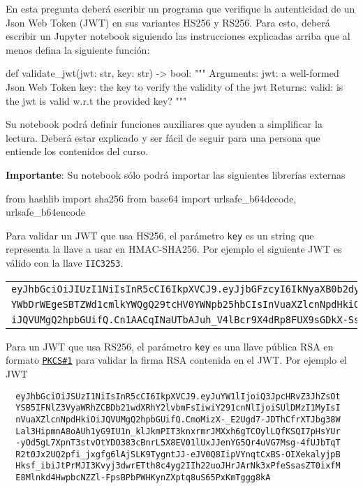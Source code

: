 
\pagebreak

En esta pregunta deberá escribir un programa que verifique la autenticidad de un Json Web Token (JWT) en sus variantes HS256 y RS256. Para esto, deberá escribir un Jupyter notebook siguiendo las instrucciones explicadas arriba que al menos defina la siguiente función:

\begin{python}
def validate_jwt(jwt: str, key: str) -> bool:
    """
    Arguments:
      jwt: a well-formed Json Web Token
      key: the key to verify the validity of the jwt
    Returns:
      valid: is the jwt is valid w.r.t the provided key?
    """
\end{python}
Su notebook podrá definir funciones auxiliares que ayuden a simplificar la lectura. Deberá estar explicado y ser fácil de seguir para una persona que entiende los contenidos del curso.

\textbf{Importante}: Su notebook sólo podrá importar las siguientes librerías externas
\begin{python}
from hashlib import sha256
from base64 import urlsafe_b64decode, urlsafe_b64encode
\end{python}


Para validar un JWT que usa HS256, el parámetro \texttt{key} es un string que representa la llave a usar en HMAC-SHA256. Por ejemplo el siguiente JWT es válido con la llave \texttt{IIC3253}.

\begin{tabular}{l}
  \texttt{eyJhbGciOiJIUzI1NiIsInR5cCI6IkpXVCJ9.eyJjbGFzcyI6IkNyaXB0b2dy}\\
  \texttt{YWbDrWEgeSBTZWd1cmlkYWQgQ29tcHV0YWNpb25hbCIsInVuaXZlcnNpdHkiO}\\
  \texttt{iJQVUMgQ2hpbGUifQ.Cn1AACqINaUTbAJuh\_V4lBcr9X4dRp8FUX9sGDkX-Ss}
\end{tabular}

Para un JWT que usa RS256, el parámetro \texttt{key} es una llave pública RSA en formato \href{https://www.rfc-editor.org/rfc/rfc8017}{\texttt{PKCS\#1}} para validar la firma RSA contenida en el JWT. Por ejemplo el JWT

\begin{verbatim}
  eyJhbGciOiJSUzI1NiIsInR5cCI6IkpXVCJ9.eyJuYW1lIjoiQ3JpcHRvZ3JhZsOt
  YSB5IFNlZ3VyaWRhZCBDb21wdXRhY2lvbmFsIiwiY291cnNlIjoiSUlDMzI1MyIsI
  nVuaXZlcnNpdHkiOiJQVUMgQ2hpbGUifQ.CmoMizX-_E2Ugd7-JDThCfrXTJbg38W
  Lal3HipmnA8oAUh1yG9IU1n_klJkmPIT3knxrmrJMXxh6gTCOylLQfKSQI7pHsYUr
  -yOd5gL7XpnT3stvOtYDO383cBnrL5X8EV01lUxJJenYG5Qr4uVG7Msg-4fUJbTqT
  R2t0Jx2UQ2pfi_jxgfg6lAjSLK9TygntJJ-eJV0Q8IipVYnqtCxBS-OIXekalyjpB
  Hksf_ibiJtPrMJI3Kvyj3dwrETth8c4yg2IIh22uoJHrJArNk3xPfeSsasZT0ixfM
  E8Mlnkd4HwpbcNZZl-FpsBPbPWHKynZXptq8uS65PxKmTggg8kA
\end{verbatim}

